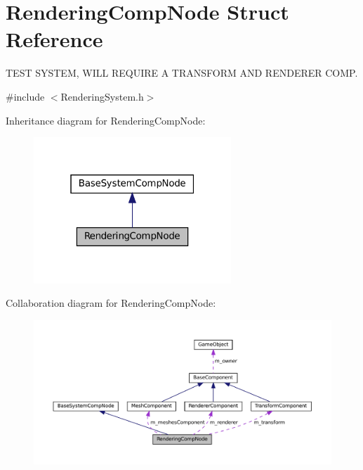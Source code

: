 \hypertarget{structRenderingCompNode}{}\section{Rendering\+Comp\+Node Struct Reference}
\label{structRenderingCompNode}


T\+E\+ST S\+Y\+S\+T\+EM, W\+I\+LL R\+E\+Q\+U\+I\+RE A T\+R\+A\+N\+S\+F\+O\+RM A\+ND R\+E\+N\+D\+E\+R\+ER C\+O\+MP.  




{\ttfamily \#include $<$Rendering\+System.\+h$>$}



Inheritance diagram for Rendering\+Comp\+Node\+:\nopagebreak
\begin{figure}[H]
\begin{center}
\leavevmode
\includegraphics[width=211pt]{structRenderingCompNode__inherit__graph}
\end{center}
\end{figure}


Collaboration diagram for Rendering\+Comp\+Node\+:\nopagebreak
\begin{figure}[H]
\begin{center}
\leavevmode
\includegraphics[width=350pt]{structRenderingCompNode__coll__graph}
\end{center}
\end{figure}
